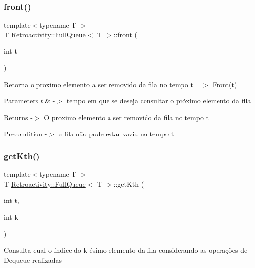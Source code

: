 \subsubsection{\texorpdfstring{front()}{front()}}
{\footnotesize\ttfamily template$<$typename T $>$ \\
T \hyperlink{classRetroactivity_1_1FullQueue}{Retroactivity\+::\+Full\+Queue}$<$ T $>$\+::front (\begin{DoxyParamCaption}\item[{int}]{t }\end{DoxyParamCaption})}

Retorna o proximo elemento a ser removido da fila no tempo t =$>$ Front(t)


\begin{DoxyParams}{Parameters}
{\em t} & -\/$>$ tempo em que se deseja consultar o próximo elemento da fila \\
\hline
\end{DoxyParams}
\begin{DoxyReturn}{Returns}
-\/$>$ O proximo elemento a ser removido da fila no tempo t 
\end{DoxyReturn}
\begin{DoxyPrecond}{Precondition}
-\/$>$ a fila não pode estar vazia no tempo t 
\end{DoxyPrecond}
\mbox{\label{classRetroactivity_1_1FullQueue_a8924244b17024f26880e5dbc6b97ffdf}} 
\subsubsection{\texorpdfstring{get\+Kth()}{getKth()}}
{\footnotesize\ttfamily template$<$typename T $>$ \\
T \hyperlink{classRetroactivity_1_1FullQueue}{Retroactivity\+::\+Full\+Queue}$<$ T $>$\+::get\+Kth (\begin{DoxyParamCaption}\item[{int}]{t,  }\item[{int}]{k }\end{DoxyParamCaption})}

Consulta qual o índice do k-\/ésimo elemento da fila considerando as operações de Dequeue realizadas


